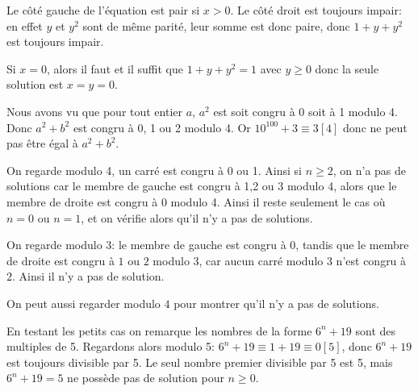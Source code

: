 

\begin{sol}
Le côté gauche de l'équation est pair si $x>0$. Le côté droit est toujours impair: en effet $y$ et $y^2$ sont de même parité, leur somme est donc paire, donc $1+y+y^2$ est toujours impair.

\smallskip

Si $x=0$, alors  il faut et il suffit que $1+y+y^2=1$ avec $y\geq 0$ donc la seule solution est $x=y=0$.
\end{sol}


\begin{sol}
Nous avons vu que pour tout entier $a$, $a^2$ est soit congru à 0 soit à 1 modulo 4. Donc $a^2 + b^2$ est congru à 0, 1 ou 2 modulo 4. Or $10^{100} + 3\equiv 3[4]$ donc ne peut pas être égal à $a^2 + b^2$.
\end{sol}


\begin{sol} 
On regarde modulo 4, un carré est congru à 0 ou 1. Ainsi si $n\geq 2$, on n'a pas de solutions car le membre de gauche est congru à 1,2 ou 3 modulo 4, alors que le membre de droite est congru à 0 modulo 4. Ainsi il reste seulement le cas où $n=0$ ou $n=1$, et on vérifie alors qu'il n'y a pas de solutions.
\end{sol}


\begin{sol} 
On regarde modulo 3: le membre de gauche est congru à $0$, tandis que le membre de droite est congru à $1$ ou $2$ modulo $3$, car aucun carré modulo $3$ n'est congru à $2$. Ainsi il n'y  a pas de solution.

\smallskip

On peut aussi regarder modulo $4$ pour montrer qu'il n'y a pas de solutions.
\end{sol}


\begin{sol}
En testant les petits cas on remarque les nombres de la forme $6^n+19$ sont des multiples de 5. Regardons alors modulo 5:
\newline
$6^n+19\equiv 1+19\equiv 0[5]$, donc $6^n+19$ est toujours divisible par 5. Le seul nombre premier divisible par 5 est 5, mais $6^n+19=5$ ne possède pas de solution pour $n\ge 0$.
\end{sol}


